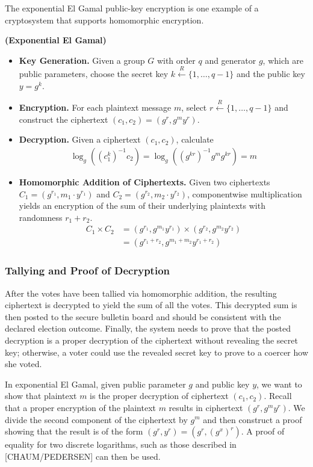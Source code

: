 The exponential El Gamal public-key encryption is one example of a cryptosystem that supports homomorphic encryption.
\begin{definition}
\textbf{(Exponential El Gamal)}
\begin{itemize}
\item \textbf{Key Generation.} Given a group $G$ with order $q$ and generator $g$, which are public parameters, choose the secret key $k \xleftarrow{R} \{1, \dotsc, q-1\}$ and the public key $y = g^k$.
\item \textbf{Encryption.} For each plaintext message $m$, select $r \xleftarrow{R} \{1, \dotsc, q-1\}$ and construct the ciphertext $(c_1, c_2) = (g^r, g^m y^r)$.
\item \textbf{Decryption.} Given a ciphertext $(c_1, c_2)$, calculate
\begin{align*}
\log_g\left((c_1^k)^{-1} c_2\right) = \log_g\left((g^{kr})^{-1} g^m g^{kr}\right) = m
\end{align*}
\item \textbf{Homomorphic Addition of Ciphertexts.} Given two ciphertexts $C_1 = (g^{r_1}, m_1 \cdot y^{r_1})$ and $C_2 = (g^{r_2}, m_2 \cdot y^{r_2})$, componentwise multiplication yields an encryption of the sum of their underlying plaintexts with randomness $r_1 + r_2$.
\begin{align*}
C_1 \times C_2 &= (g^{r_1}, g^{m_1} y^{r_1}) \times (g^{r_2}, g^{m_2} y^{r_2}) \\
&= (g^{r_1 + r_2}, g^{m_1 + m_2} y^{r_1 + r_2})
\end{align*}
\end{itemize}
\end{definition}

\subsubsection{Tallying and Proof of Decryption}

After the votes have been tallied via homomorphic addition, the resulting ciphertext is decrypted to yield the sum of all the votes. This decrypted sum is then posted to the secure bulletin board and should be consistent with the declared election outcome. Finally, the system needs to prove that the posted decryption is a proper decryption of the ciphertext without revealing the secret key; otherwise, a voter could use the revealed secret key to prove to a coercer how she voted.

In exponential El Gamal, given public parameter $g$ and public key $y$, we want to show that plaintext $m$ is the proper decryption of ciphertext $(c_1, c_2)$. Recall that a proper encryption of the plaintext $m$ results in ciphertext $(g^r, g^m y^r)$. We divide the second component of the ciphertext by $g^m$ and then construct a proof showing that the result is of the form $(g^r, y^r) = (g^r, (g^x)^r)$. A proof of equality for two discrete logarithms, such as those described in [CHAUM/PEDERSEN] can then be used.

